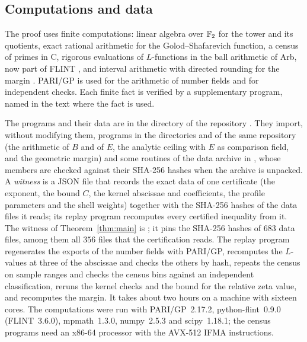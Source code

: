\subsection{Computations and data}\label{intro:code}
The proof uses finite computations: linear algebra over $\mathbb F_2$ for the
tower and its quotients, exact rational arithmetic for the
Golod--Shafarevich function, a census of primes in C, rigorous
evaluations of $L$-functions in the ball arithmetic of Arb, now part of
FLINT \cite{Johansson2017,FLINT}, and interval arithmetic with directed
rounding for the margin \cite{Mpmath}. PARI/GP \cite{PARI} is used for
the arithmetic of number fields and for independent checks. Each finite
fact is verified by a supplementary program, named in the text where the
fact is used.

The programs and their data are in the directory
 of the repository
\cite{NaslundCode4317}. They import, without modifying them, programs
in the directories  and
 of the same repository (the
arithmetic of $B$ and of $E$, the analytic ceiling with $E$ as comparison
field, and the geometric margin) and some routines of the data archive in
, whose members are checked against
their SHA-256 hashes when the archive is unpacked. A \emph{witness} is a JSON file that
records the exact data of one certificate (the exponent, the bound $C$,
the kernel abscissae and coefficients, the profile parameters and the
shell weights) together with the SHA-256 hashes of the data files it
reads; its replay program recomputes every certified inequality from it.
The witness of Theorem~\ref{thm:main} is
; it pins the
SHA-256 hashes of $683$ data files, among them all $356$ files that the
certification reads.
The replay program 
regenerates the exports of the number fields with PARI/GP, recomputes
the $L$-values at three of the abscissae and checks the others by hash,
repeats the census on sample ranges and checks the census bins against
an independent classification, reruns the kernel checks and the bound
for the relative zeta value, and recomputes the margin. It takes about
two hours on a machine with sixteen cores. The computations were run
with PARI/GP~2.17.2, python-flint~0.9.0 (FLINT~3.6.0), mpmath~1.3.0,
numpy~2.5.3 and scipy~1.18.1; the census programs need an x86-64
processor with the AVX-512 IFMA instructions.
